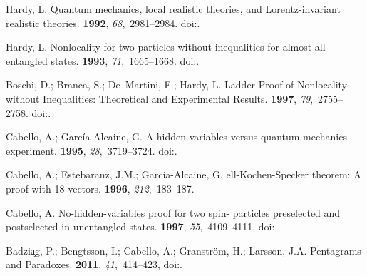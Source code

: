 \begin{thebibliography}{999}
Hardy, L.
\newblock Quantum mechanics, local realistic theories, and Lorentz-invariant
 realistic theories.
 {\bf 1992}, {\em 68},~2981--2984.
\newblock
 doi:{\href{https://doi.org/10.1103/PhysRevLett.68.2981}{}}.

Hardy, L.
\newblock Nonlocality for two particles without inequalities for almost all
 entangled states.
 {\bf 1993}, {\em 71},~1665--1668.
\newblock
 doi:{\href{https://doi.org/10.1103/PhysRevLett.71.1665}{}}.

Boschi, D.; Branca, S.; De~Martini, F.; Hardy, L.
\newblock Ladder Proof of Nonlocality without Inequalities: Theoretical and
 Experimental Results.
 {\bf 1997}, {\em 79},~2755--2758.
\newblock
 doi:{\href{https://doi.org/10.1103/PhysRevLett.79.2755}{}}.

Cabello, A.; Garc{\'{i}}a-Alcaine, G.
\newblock A hidden-variables versus quantum mechanics experiment.
 {\bf
 1995}, {\em 28},~3719--3724.
\newblock
 doi:{\href{https://doi.org/10.1088/0305-4470/28/13/016}{}}.

Cabello, A.; Estebaranz, J.M.; Garc{\'{i}}a-Alcaine, G.
ell-{K}ochen-{S}pecker theorem: A proof with 18 vectors.
 {\bf 1996}, {\em 212},~183--187.

Cabello, A.
\newblock No-hidden-variables proof for two spin- particles preselected and
 postselected in unentangled states.
 {\bf 1997}, {\em 55},~4109--4111.
\newblock
 doi:{\href{https://doi.org/10.1103/PhysRevA.55.4109}{}}.

Badzi\c{a}g, P.; Bengtsson, I.; Cabello, A.; Granstr\"om, H.; Larsson, J.A.
\newblock Pentagrams and Paradoxes.
 {\bf 2011}, {\em 41},~414--423,
\newblock
 doi:{\href{https://doi.org/10.1007/s10701-010-9433-3}{}}.


\end{thebibliography}
